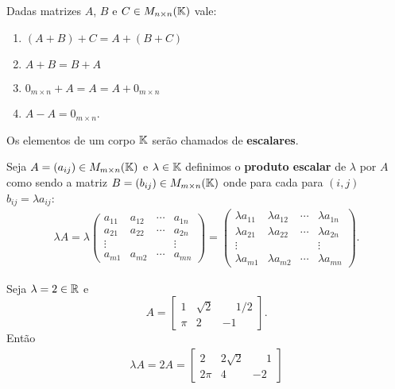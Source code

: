\begin{proposicao}
	Dadas matrizes $A$, $B$ e $C \in M_{n\times n}(\mathbb{K})$ vale:
	\begin{enumerate}[label={\roman*})]
		\item $(A + B) + C = A + (B + C)$
		\item $A + B = B + A$
        \item $0_{m \times n} + A = A = A + 0_{m \times n}$
        \item $A - A = 0_{m \times n}$.
	\end{enumerate}
\end{proposicao}

\begin{observacao}
    Os elementos de um corpo $\mathbb{K}$ serão chamados de \textbf{escalares}.
\end{observacao}

\begin{definicao}
    Seja $A = (a_{ij}) \in M_{m\times n}(\mathbb{K})$ e $\lambda \in \mathbb{K}$ definimos o \textbf{produto escalar} de $\lambda$ por $A$ como sendo a matriz $B = (b_{ij}) \in M_{m\times n}(\mathbb{K})$ onde para cada para $(i,j)$ $b_{ij} = \lambda a_{ij}$:
	\begin{align*}
		\lambda A = \lambda \begin{pmatrix}
		a_{11} & a_{12} & \cdots & a_{1n}\\
		a_{21} & a_{22} & \cdots & a_{2n}\\
		\vdots & & & \vdots\\
		a_{m1} & a_{m2} & \cdots & a_{mn}
	\end{pmatrix} = \begin{pmatrix}
		\lambda a_{11} & \lambda a_{12} & \cdots & \lambda a_{1n}\\
		\lambda a_{21} & \lambda a_{22} & \cdots & \lambda a_{2n}\\
		\vdots & & & \vdots\\
		\lambda a_{m1} & \lambda a_{m2} & \cdots & \lambda a_{mn}
	\end{pmatrix}.
	\end{align*}
\end{definicao}
\begin{exemplo}
    Seja $\lambda = 2 \in \mathbb{R}$ e
    \[
        A = \begin{bmatrix}
            1 & \sqrt{2} & \phantom{-}1/2\\
            \pi & 2 & -1
        \end{bmatrix}.
    \]
    Então
    \begin{align*}
        \lambda A = 2A = \begin{bmatrix}
            2 & 2\sqrt{2} & \phantom{-}1\\
            2\pi & 4 & -2
        \end{bmatrix}
    \end{align*}
\end{exemplo}

